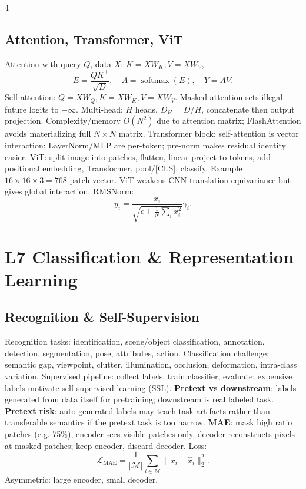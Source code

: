 \documentclass[8pt,a4paper,landscape]{extarticle}
\newcommand{\key}[1]{\textbf{#1}}
\DeclareMathOperator{\softmax}{softmax}
\begin{document}
\begin{multicols*}{4}
\subsection{Attention, Transformer, ViT}
Attention with query $Q$, data $X$: $K=XW_K,V=XW_V$,
\[
E=\frac{QK^\top}{\sqrt{D}},\quad A=\softmax(E),\quad Y=AV.
\]
Self-attention: $Q=XW_Q,K=XW_K,V=XW_V$. Masked attention sets illegal future logits to $-\infty$. Multi-head: $H$ heads, $D_H=D/H$, concatenate then output projection. Complexity/memory $O(N^2)$ due to attention matrix; FlashAttention avoids materializing full $N\times N$ matrix.
Transformer block: self-attention is vector interaction; LayerNorm/MLP are per-token; pre-norm makes residual identity easier. ViT: split image into patches, flatten, linear project to tokens, add positional embedding, Transformer, pool/[CLS], classify. Example $16\times16\times3=768$ patch vector. ViT weakens CNN translation equivariance but gives global interaction.
RMSNorm:
\[
y_i=\frac{x_i}{\sqrt{\epsilon+\frac1N\sum_i x_i^2}}\gamma_i.
\]

\section{L7 Classification \& Representation Learning}
\subsection{Recognition \& Self-Supervision}
Recognition tasks: identification, scene/object classification, annotation, detection, segmentation, pose, attributes, action. Classification challenge: semantic gap, viewpoint, clutter, illumination, occlusion, deformation, intra-class variation. Supervised pipeline: collect labels, train classifier, evaluate; expensive labels motivate self-supervised learning (SSL).
\key{Pretext vs downstream}: labels generated from data itself for pretraining; downstream is real labeled task. \key{Pretext risk}: auto-generated labels may teach task artifacts rather than transferable semantics if the pretext task is too narrow.
\key{MAE}: mask high ratio patches (e.g. 75\%), encoder sees visible patches only, decoder reconstructs pixels at masked patches; keep encoder, discard decoder. Loss:
\[
\mathcal L_{\mathrm{MAE}}=\frac1{|\mathcal M|}\sum_{i\in\mathcal M}\|x_i-\hat x_i\|_2^2.
\]
Asymmetric: large encoder, small decoder.


\end{multicols*}
\end{document}
